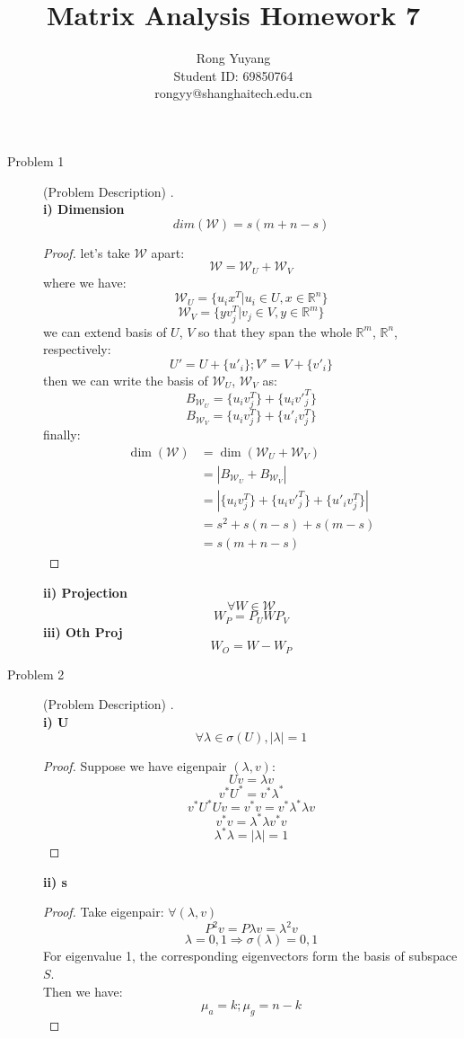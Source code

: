 \documentclass{article}
\title{Matrix Analysis Homework 7}
\author{Rong Yuyang \\ Student ID: 69850764 \\ rongyy@shanghaitech.edu.cn}
\begin{document}
\maketitle

\begin{description}
	\item[Problem 1] (Problem Description)
	.\\
	\textbf{i) Dimension}
		$$dim(\mathcal{W}) = s(m+n-s)$$
		\begin{proof}
			let's take $\mathcal{W}$ apart:
			$$\mathcal{W} = \mathcal{W}_U + \mathcal{W}_V$$
			where we have:
			$$ \mathcal{W}_U = \{u_ix^T | u_i \in U, x \in \mathbb{R}^n\}$$
			$$ \mathcal{W}_V = \{yv_j^T | v_j \in V, y \in \mathbb{R}^m\}$$
			we can extend basis of $U$, $V$ so that they span the whole $\mathbb{R}^m$, $\mathbb{R}^n$, respectively:
			$$U' = U + \{u'_i\}; V' = V + \{v'_i\}$$
			then we can write the basis of $ \mathcal{W}_U$, $\mathcal{W}_V$ as:
			$$B_{\mathcal{W}_U} = \{u_iv_j^T\} + \{u_iv'_j^T\}$$
			$$B_{\mathcal{W}_V} = \{u_iv_j^T\} + \{u'_iv_j^T\}$$
			finally:
			\begin{equation}\begin{aligned}
				\dim(\mathcal{W}) 
				& = \dim(\mathcal{W}_U + \mathcal{W}_V) \\
				& = |B_{\mathcal{W}_U} + B_{\mathcal{W}_V}| \\
				& = |\{u_iv_j^T\} + \{u_iv'_j^T\} + \{u'_iv_j^T\}| \\
				& = s^2 + s(n-s) + s(m-s) \\
				& = s(m+n-s)
			\end{aligned}\end{equation} 
		\end{proof}
	\textbf{ii) Projection}
		$$\forall W \in \mathcal{W}$$
		$$W_P = P_UWP_V$$
	\textbf{iii) Oth Proj}
		$$W_O = W - W_P$$

	\item[Problem 2] (Problem Description)
	.\\
	\textbf{i) U}
	$$\forall \lambda \in \sigma(U), |\lambda| = 1$$
	\begin{proof}
		Suppose we have eigenpair $(\lambda, v)$:
		$$ Uv = \lambda v$$
		$$ v^*U^* = v^*\lambda^*$$
		$$ v^*U^* Uv = v^*v = v^*\lambda^*\lambda v$$
		$$ v^*v = \lambda^*\lambda v^*v$$
		$$ \lambda^*\lambda = |\lambda| = 1$$
	\end{proof}
	\textbf{ii) s}
	\begin{proof}
		Take eigenpair: $\forall (\lambda, v)$
		$$P^2v = P\lambda v = \lambda^2 v$$
		$$ \lambda = 0, 1 \Rightarrow \sigma(\lambda) = {0, 1}$$
		For eigenvalue 1, the corresponding eigenvectors form the basis of subspace $S$.\\
		Then we have:
		$$ \mu_a = k; \mu_g = n - k$$
	\end{proof}

\end{description}
\end{document}

